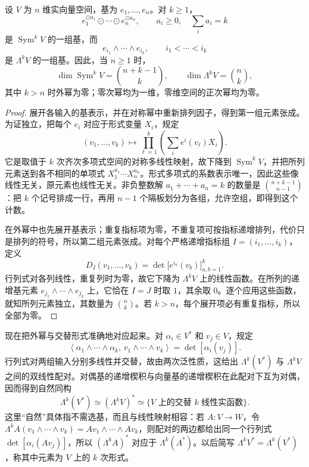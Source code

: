 \begin{proposition}
	\label{g1:prop:symmetric-exterior-bases}
	设 \(V\) 为 \(n\) 维实向量空间，基为 \(e_1,\ldots,e_n\)。对 \(k\ge1\)，
	\[
		e_1^{\odot a_1}\odot\cdots\odot e_n^{\odot a_n},
		\qquad a_i\ge0,\quad \sum_i a_i=k
	\]
	是 \(\operatorname{Sym}^kV\) 的一组基，而
	\[
		e_{i_1}\wedge\cdots\wedge e_{i_k},\qquad i_1<\cdots<i_k
	\]
	是 \(\Lambda^kV\) 的一组基。因此，当 \(n\ge1\) 时，
	\[
		\dim\operatorname{Sym}^kV=\binom{n+k-1}{k},\qquad
		\dim\Lambda^kV=\binom nk,
	\]
	其中 \(k>n\) 时外幂为零；零次幂均为一维，零维空间的正次幂均为零。
\end{proposition}
\begin{proof}
	展开各输入的基表示，并在对称幂中重新排列因子，得到第一组元素张成。为证独立，把每个 \(e_i\) 对应于形式变量 \(X_i\)，规定
	\[
		(v_1,\ldots,v_k)\longmapsto
		\prod_{\ell=1}^k\left(\sum_i e^i(v_\ell)X_i\right).
	\]
	它是取值于 \(k\) 次齐次多项式空间的对称多线性映射，故下降到 \(\operatorname{Sym}^kV\)，并把所列元素送到各不相同的单项式 \(X_1^{a_1}\cdots X_n^{a_n}\)。形式多项式的系数表示唯一，因此这些像线性无关，原元素也线性无关。非负整数解 \(a_1+\cdots+a_n=k\) 的数量是 \(\binom{n+k-1}{n-1}\)：把 \(k\) 个记号排成一行，再用 \(n-1\) 个隔板划分为各组，允许空组，即得到这个计数。

	在外幂中也先展开基表示；重复指标项为零，不重复项可按指标递增排列，代价只是排列的符号，所以第二组元素张成。对每个严格递增指标组 \(I=(i_1,\ldots,i_k)\)，定义
	\[
		D_I(v_1,\ldots,v_k)=\det\bigl[e^{i_a}(v_b)\bigr]_{a,b=1}^k.
	\]
	行列式对各列线性，重复列时为零，故它下降为 \(\Lambda^kV\) 上的线性函数。在所列的递增基元素 \(e_{j_1}\wedge\cdots\wedge e_{j_k}\) 上，它恰在 \(I=J\) 时取 \(1\)，其余取 \(0\)。逐个应用这些函数，就知所列元素独立，其数量为 \(\binom nk\)。若 \(k>n\)，每个展开项必有重复指标，所以全部为零。
\end{proof}

现在把外幂与交替形式准确地对应起来。对 \(\alpha_i\in V^*\) 和 \(v_j\in V\)，规定
\begin{equation}
	\label{g1:eq:exterior-determinant-pairing}
	\left\langle\alpha_1\wedge\cdots\wedge\alpha_k,\,
	v_1\wedge\cdots\wedge v_k\right\rangle
	=\det[\alpha_i(v_j)].
\end{equation}
行列式对两组输入分别多线性并交替，故由两次泛性质，这给出 \(\Lambda^k(V^*)\) 与 \(\Lambda^kV\) 之间的双线性配对。对偶基的递增楔积与向量基的递增楔积在此配对下互为对偶，因而得到自然同构
\[
	\Lambda^k(V^*)\simeq(\Lambda^kV)^*
	\simeq\{\text{\(V\) 上的交替 \(k\) 线性实函数}\}.
\]
这里“自然”具体指不需选基，而且与线性映射相容：若 \(A:V\to W\)，令 \(\Lambda^kA(v_1\wedge\cdots\wedge v_k)=Av_1\wedge\cdots\wedge Av_k\)，则配对的两边都给出同一个行列式 \(\det[\alpha_i(Av_j)]\)，所以 \((\Lambda^kA)^*\) 对应于 \(\Lambda^k(A^*)\)。以后简写 \(\Lambda^kV^*=\Lambda^k(V^*)\)，称其中元素为 \(V\) 上的 \(k\) 次形式。

